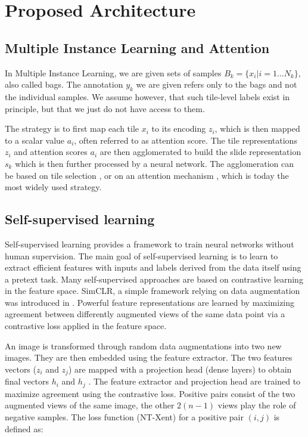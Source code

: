 \section{Proposed Architecture}

\subsection{Multiple Instance Learning and Attention}

In Multiple Instance Learning, we are given sets of samples $B_k = \{x_i | i = 1 \ldots N_k\}$, also called bags. The annotation $y_k$ we are given refers only to the bags and not the individual samples. We assume however, that such tile-level labels exist in principle, but that we just do not have access to them. 

The strategy is to first map each tile $x_i$ to its encoding $z_i$, which is then mapped to a scalar value $a_i$, often referred to as attention score. The tile representations $z_i$ and attention scores $a_i$ are then agglomerated to build the slide representation $s_k$ which is then further processed by a neural network. The agglomeration can be based on tile selection \citep{campanella_clinical-grade_2019, courtiol_classification_2020}, or on an attention mechanism \citep{ilse_attention-based_2018}, which is today the most widely used strategy. 

\subsection{Self-supervised learning}

Self-supervised learning provides a framework to train neural networks without human supervision. The main goal of self-supervised learning is to learn to extract efficient features with inputs and labels derived from the data itself using a pretext task. Many self-supervised approaches are based on contrastive learning in the feature space. SimCLR, a simple framework relying on data augmentation was introduced in \citep{chen_simple_2020}. Powerful feature representations are learned by maximizing agreement between differently augmented views of the same data point via a contrastive loss applied in the feature space.

An image is transformed through random data augmentations into two new images. They are then embedded using the feature extractor. The two features vectors ($z_i$ and $z_j$) are mapped with a projection head (dense layers) to obtain final vectors $h_i$ and $h_j$ . The feature extractor and projection head are trained to maximize agreement using the contrastive loss. Positive pairs consist of the two augmented views of the same image, the other $2( n - 1 )$ views play the role of negative samples.
The loss function (NT-Xent) for a positive pair $(i,j)$ is defined as:

